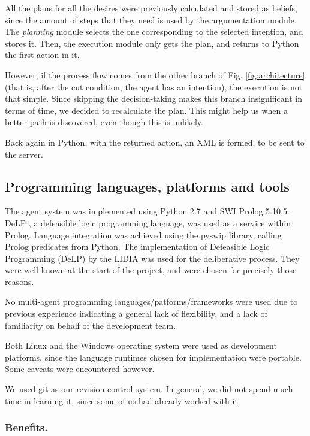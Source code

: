 \documentclass{llncs2e/llncs}
\begin{document}
    All the plans for all the desires were previously calculated and stored as 
    beliefs, since the amount of steps that they need is used by the 
    argumentation module. The \textit{planning} module selects the one 
    corresponding to the selected intention, and stores it. Then, the execution module only gets the plan, and returns to Python the first 
    action in it.

    However, if the process flow comes from the other branch of Fig. \ref{fig:architecture} (that is, after the cut condition, the agent has an intention), the execution is not that simple. Since skipping the 
    decision-taking makes this branch insignificant in terms of time, we decided 
    to recalculate the plan. This might help us when a better path is 
    discovered, even though this is unlikely.

    Back again in Python, with the returned action, an XML is formed, to be sent 
    to the server.

\subsection{Programming languages, platforms and tools}

    The agent system was implemented using Python 2.7 and SWI Prolog 5.10.5. DeLP 
    \cite{Garcia:2004a}, a defeasible logic programming language, was used as a 
    service within Prolog. 
    Language integration was achieved using the pyswip library, calling Prolog 
    predicates from Python. The implementation of Defeasible Logic Programming 
    (DeLP) by the LIDIA was used for the deliberative process. They were 
    well-known at the start of the project, and were chosen for precisely those
    reasons.

    No multi-agent programming languages/patforms/frameworks were used due to 
    previous experience indicating a general lack of flexibility, and a lack of 
    familiarity on behalf of the development team.
    
    Both Linux and the Windows operating system were used as development 
    platforms, since the language runtimes chosen for implementation were 
    portable. Some caveats were encountered however.

    We used git as our revision control system. In general, we did not spend much 
    time in learning it, since some of us had already worked with it.

\subsubsection{Benefits.}
    
\end{document}

